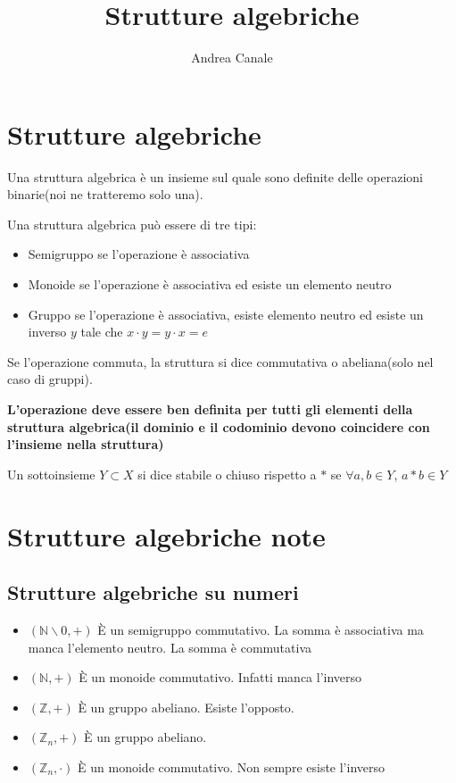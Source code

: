 \documentclass[a4paper, 10pt]{article}
\title{Strutture algebriche}
\author{Andrea Canale}
\begin{document}
	\maketitle
	\tableofcontents
	
\section{Strutture algebriche}

Una struttura algebrica è un insieme sul quale sono definite delle operazioni binarie(noi ne tratteremo solo una).

Una struttura algebrica può essere di tre tipi:

\begin{itemize}
	\item Semigruppo se l'operazione è associativa
	\item Monoide se l'operazione è associativa ed esiste un elemento neutro
	\item Gruppo se l'operazione è associativa, esiste elemento neutro ed esiste un inverso $y$ tale che $x \cdot y = y \cdot x = e$
\end{itemize}

Se l'operazione commuta, la struttura si dice commutativa o abeliana(solo nel caso di gruppi).

\textbf{L'operazione deve essere ben definita per tutti gli elementi della struttura algebrica(il dominio e il codominio devono coincidere con l'insieme nella struttura)}

Un sottoinsieme $Y \subset X$ si dice stabile o chiuso rispetto a $*$ se $\forall a, b \in Y$, $a * b \in Y$

\section{Strutture algebriche note}

\subsection{Strutture algebriche su numeri}
\begin{itemize}
	\item $(\mathbb{N} \backslash 0,+)$ È un semigruppo commutativo. La somma è associativa ma manca l’elemento neutro. La somma è commutativa
	\item $(\mathbb{N} ,+)$ È un monoide commutativo. Infatti manca l’inverso
	\item $(\mathbb{Z},+)$ È un gruppo abeliano. Esiste l’opposto.
	\item $(\mathbb{Z}_n,+)$ È un gruppo abeliano.
	\item $(\mathbb{Z}_n, \cdot)$ È un monoide commutativo. Non sempre esiste l’inverso
\end{itemize}
\end{document}
